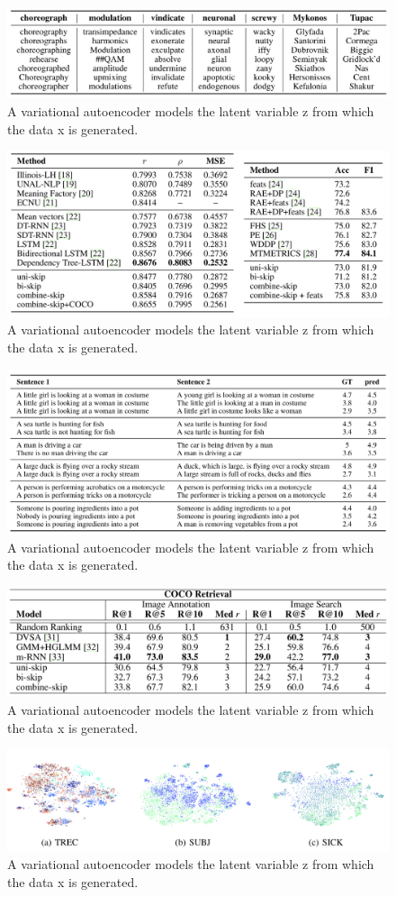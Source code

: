 \begin{figure}
\centering
  \includegraphics[width=.5\linewidth]{files/skipthoughts-3.png}
  \caption{A variational autoencoder models the latent variable z from which the data x is generated.}
  \label{fig:vae}
\end{figure}

\begin{figure}
\centering
  \includegraphics[width=.5\linewidth]{files/skipthoughts-4.png}
  \caption{A variational autoencoder models the latent variable z from which the data x is generated.}
  \label{fig:vae}
\end{figure}

\begin{figure}
\centering
  \includegraphics[width=.5\linewidth]{files/skipthoughts-5.png}
  \caption{A variational autoencoder models the latent variable z from which the data x is generated.}
  \label{fig:vae}
\end{figure}

\begin{figure}
\centering
  \includegraphics[width=.5\linewidth]{files/skipthoughts-6.png}
  \caption{A variational autoencoder models the latent variable z from which the data x is generated.}
  \label{fig:vae}
\end{figure}

\begin{figure}
\centering
  \includegraphics[width=.5\linewidth]{files/skipthoughts-7.png}
  \caption{A variational autoencoder models the latent variable z from which the data x is generated.}
  \label{fig:vae}
\end{figure}

